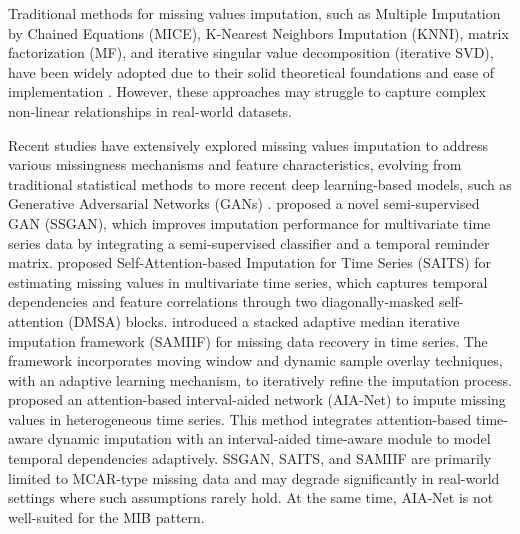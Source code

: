 \documentclass[3p,11pt,authoryear]{elsarticle}
\begin{document}
Traditional methods for missing values imputation, such as Multiple Imputation by Chained Equations (MICE), K-Nearest Neighbors Imputation (KNNI), matrix factorization (MF), and iterative singular value decomposition (iterative SVD), have been widely adopted due to their solid theoretical foundations and ease of implementation \citep{van2000multivariate, cover1967nearest, koren2009matrix, troyanskaya2001missing}. However, these approaches may struggle to capture complex non-linear relationships in real-world datasets. 

Recent studies have extensively explored missing values imputation to address various missingness mechanisms and feature characteristics, evolving from traditional statistical methods to more recent deep learning-based models, such as Generative Adversarial Networks (GANs) \citep{goodfellow2014generative}. 
\citet{miao2021ssgan} proposed a novel semi-supervised GAN (SSGAN), which improves imputation performance for multivariate time series data by integrating a semi-supervised classifier and a temporal reminder matrix.
\citet{du2023saits} proposed Self-Attention-based Imputation for Time Series (SAITS) for estimating missing values in multivariate time series, which captures temporal dependencies and feature correlations through two diagonally-masked self-attention (DMSA) blocks. 
\citet{yuan2024missing} introduced a stacked adaptive median iterative imputation framework (SAMIIF) for missing data recovery in time series. The framework incorporates moving window and dynamic sample overlay techniques, with an adaptive learning mechanism, to iteratively refine the imputation process. 
\citet{yuan2023attention} proposed an attention-based interval-aided network (AIA-Net) to impute missing values in heterogeneous time series. This method integrates attention-based time-aware dynamic imputation with an interval-aided time-aware module to model temporal dependencies adaptively. 
SSGAN, SAITS, and SAMIIF are primarily limited to MCAR-type missing data and may degrade significantly in real-world settings where such assumptions rarely hold. At the same time, AIA-Net is not well-suited for the MIB pattern. 
\end{document}
